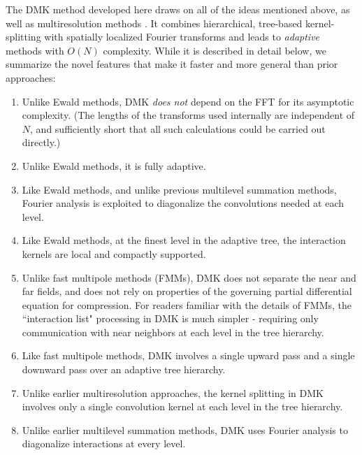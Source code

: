 \documentclass[final,letterpaper]{siamart171218}
\newcommand{\acron}{DMK }
\begin{document}
The \acron method developed here
draws on all of the ideas mentioned above, as well as 
multiresolution methods 
\cite{beylkin2009jcp,beylkinmohl2002,beylkin2010acha,harrisonbeylkin2004}.
It combines hierarchical, tree-based kernel-splitting with spatially localized Fourier 
transforms and leads to {\em adaptive} methods with $O(N)$ complexity.
While it is described in detail below, we summarize the novel 
features that make it faster and more general than prior approaches:

\vspace{.2in}

\begin{enumerate}
\item Unlike Ewald methods, \acron {\em does not} depend on the FFT for its asymptotic
complexity.
(The lengths of the transforms used internally are independent of $N$, and 
sufficiently short that all such calculations could be carried out directly.)
\item Unlike Ewald methods, it is fully adaptive.
\item Like Ewald methods, and unlike previous multilevel summation methods, Fourier
analysis is exploited to diagonalize the convolutions needed at each level.
\item Like Ewald methods, at the finest level in the adaptive tree, 
the interaction kernels are local and compactly supported. 
\item Unlike fast multipole methods (FMMs), \acron does not separate the 
near and far fields, and does not rely on properties of the governing partial 
differential equation for compression.
For readers familiar with the details of FMMs, the ``interaction list" processing 
in \acron is much simpler - requiring only communication with near neighbors 
at each level in the tree hierarchy.
\item Like fast multipole methods, \acron involves a single upward pass and
a single downward pass over an adaptive tree hierarchy.
\item Unlike earlier multiresolution approaches, the kernel splitting in \acron
involves only a single convolution kernel at each level in the tree hierarchy.
\item Unlike earlier multilevel summation methods, \acron
uses Fourier analysis to diagonalize interactions at every level.
\end{enumerate}

\vspace{.2in}
\end{document}
